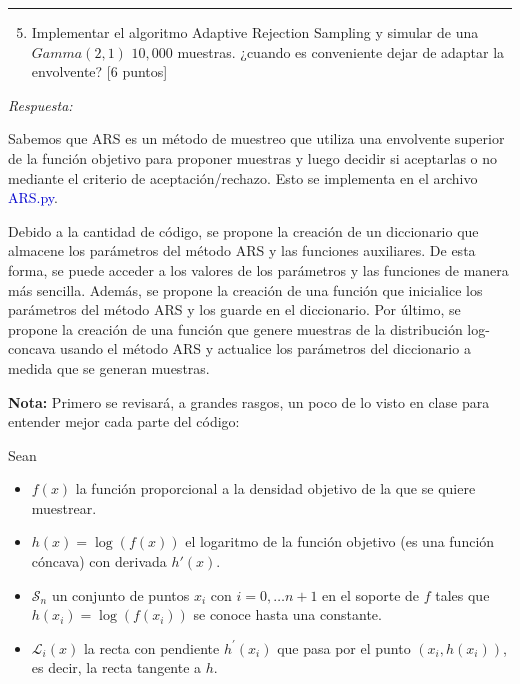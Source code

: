 \vspace{5mm}
{\color{lightgray} \hrule}
\begin{enumerate} \setcounter{enumi}{4}
	\item Implementar el algoritmo Adaptive Rejection Sampling y simular de una $Gamma(2,1)$ $10,000$ muestras. ¿cuando es conveniente dejar de adaptar la envolvente? [6 puntos]
\end{enumerate}

\textcolor{BrickRed}{\it Respuesta:}

Sabemos que ARS es un método de muestreo que utiliza una envolvente superior de la función objetivo para proponer muestras y luego decidir si aceptarlas o no mediante el criterio de aceptación/rechazo. Esto se implementa en el archivo  \textcolor{mediumblue}{ARS.py}.

Debido a la cantidad de código, se propone la creación de un diccionario que almacene los parámetros del método ARS y las funciones auxiliares. De esta forma, se puede acceder a los valores de los parámetros y las funciones de manera más sencilla. Además, se propone la creación de una función que inicialice los parámetros del método ARS y los guarde en el diccionario. Por último, se propone la creación de una función que genere muestras de la distribución log-concava usando el método ARS y actualice los parámetros del diccionario a medida que se generan muestras.

\textbf{Nota:} Primero se revisará, a grandes rasgos, un poco de lo visto en clase para entender mejor cada parte del código:

Sean
\begin{itemize}
	\item $f(x)$ la función proporcional a la densidad objetivo de la que se quiere muestrear.
	\item $h(x) = \log{(f(x))}$ el logaritmo de la función objetivo (es una función cóncava) con derivada $h'(x)$.
	\item $\mathcal{S}_n$ un conjunto de puntos $x_{i}$ con $i = 0,\dots n+1$ en el soporte de $f$ tales que $h(x_i) = \log{(f(x_i))}$ se conoce hasta una constante.
	\item $\mathcal{L}_{i}(x)$ la recta con pendiente $h^{'}(x_{i})$ que pasa por el punto $(x_i, h(x_i))$, es decir, la recta tangente a $h$.
\end{itemize}

